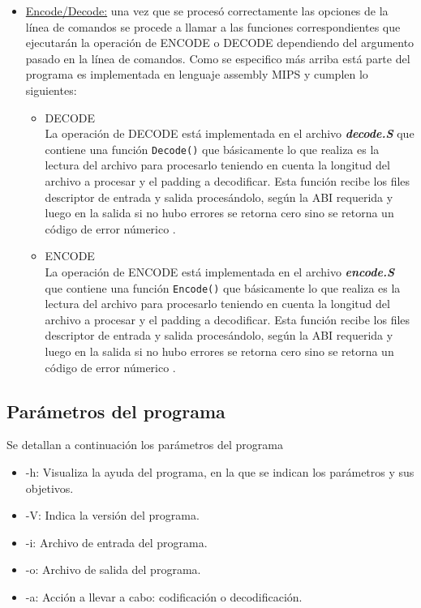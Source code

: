 \documentclass[11pt,a4paper]{article}
\begin{document}
\begin{itemize}
	\item \underline{Encode/Decode:} una vez que se procesó correctamente las opciones de la línea de comandos se procede a llamar a las funciones correspondientes que ejecutarán la operación de ENCODE o DECODE dependiendo del argumento pasado en la línea de comandos. Como se especifico más arriba está parte del programa es implementada en lenguaje assembly MIPS y cumplen lo siguientes:
\begin{itemize}
	\item{DECODE}\\
La operación de DECODE está implementada en el archivo \textit{\textbf{decode.S}} que contiene una función
\texttt{Decode()} que básicamente lo que realiza es la lectura del archivo para procesarlo teniendo en cuenta la longitud del archivo a procesar y el padding a decodificar. Esta función recibe los files descriptor de entrada y salida procesándolo, según la ABI requerida y luego en la salida si no hubo errores se retorna cero sino se retorna un código de error númerico .

	\item{ENCODE}\\
La operación de ENCODE está implementada en el archivo \textit{\textbf{encode.S}} que contiene una función
\texttt{Encode()} que básicamente lo que realiza es la lectura del archivo para procesarlo teniendo en cuenta la longitud del archivo a procesar y el padding a decodificar. Esta función recibe los files descriptor de entrada y salida procesándolo, según la ABI requerida y luego en la salida si no hubo errores se retorna cero sino se retorna un código de error númerico .
	\end{itemize}

	\end{itemize}


\subsection{Parámetros del programa}

Se detallan a continuación los parámetros del programa

\begin{itemize}
    \item -h: Visualiza la ayuda del programa, en la que se indican los parámetros y sus objetivos.
    \item -V: Indica la versión del programa.
    \item -i: Archivo de entrada del programa.
    \item -o: Archivo de salida del programa.
    \item -a: Acción a llevar a cabo: codificación o decodificación.
\end{itemize}
\end{document}
